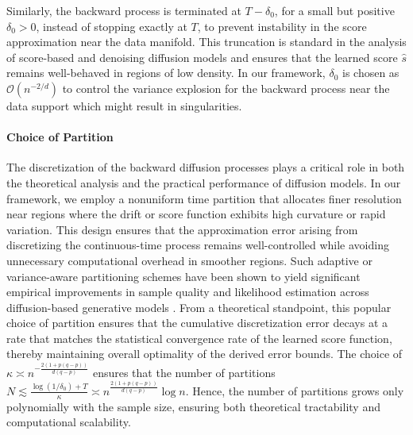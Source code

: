 \documentclass[12pts]{article}
\newcommand{\cO}{ \mathcal{O}}
\begin{document}
Similarly, the backward process is terminated at $T-\delta_0$, for a small but positive $\delta_0 > 0$, instead of stopping exactly at $T$, to prevent instability in the score approximation near the data manifold. This truncation is standard in the analysis of score-based and denoising diffusion models \citep{songscore,lai2025principlesdiffusionmodels} and ensures that the learned score $\hat{s}$ remains well-behaved in regions of low density. In our framework, $\delta_0$ is chosen as $\cO(n^{-2/d})$ to control the variance explosion for the backward process near the data support which might result in singularities.

\paragraph{Choice of Partition}
The discretization of the backward diffusion processes plays a critical role in both the theoretical analysis and the practical performance of diffusion models. In our framework, we employ a nonuniform time partition that allocates finer resolution near regions where the drift or score function exhibits high curvature or rapid variation. This design ensures that the approximation error arising from discretizing the continuous-time process remains well-controlled while avoiding unnecessary computational overhead in smoother regions. Such adaptive or variance-aware partitioning schemes have been shown to yield significant empirical improvements in sample quality and likelihood estimation across diffusion-based generative models \citep{songscore,ho2020denoising,kingma2021variational,lu2022dpm}. From a theoretical standpoint, this popular choice of partition \citep{benton2024nearly,chen2023improved} ensures that the cumulative discretization error decays at a rate that matches the statistical convergence rate of the learned score function, thereby maintaining overall optimality of the derived error bounds. The choice of $\kappa \asymp n^{-\frac{2 (1+p(q-p))}{d(q-p)}} $ ensures that the number of partitions $N \lesssim \frac{\log (1/\delta_0) + T}{\kappa} \asymp n^{\frac{2 (1+p(q-p))}{d(q-p)}} \log n$. Hence, the number of partitions grows only polynomially with the sample size, ensuring both theoretical tractability and computational scalability.
\end{document}
